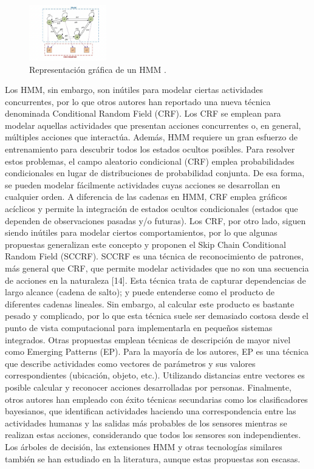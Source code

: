 \documentclass{article}
\begin{document}
\begin{figure}
\centering
\includegraphics[width=0.3\textwidth]{punto2.png}
\caption{\label{fig:frog}Representación gráfica de un HMM .}
\end{figure}

Los HMM, sin embargo, son inútiles para modelar ciertas actividades concurrentes, por lo que otros autores han reportado una nueva técnica denominada Conditional Random Field (CRF). Los CRF se emplean para modelar aquellas actividades que presentan acciones concurrentes o, en general, múltiples acciones que interactúa. Además, HMM requiere un gran esfuerzo de entrenamiento para descubrir todos los estados ocultos posibles. Para resolver estos problemas, el campo aleatorio condicional (CRF) emplea probabilidades condicionales en lugar de distribuciones de probabilidad conjunta. De esa forma, se pueden modelar fácilmente actividades cuyas acciones se desarrollan en cualquier orden. A diferencia de las cadenas en HMM, CRF emplea gráficos acíclicos y permite la integración de estados ocultos condicionales (estados que dependen de observaciones pasadas y/o futuras).
Los CRF, por otro lado, siguen siendo inútiles para modelar ciertos comportamientos, por lo que algunas propuestas generalizan este concepto y proponen el Skip Chain Conditional Random Field (SCCRF). SCCRF es una técnica de reconocimiento de patrones, más general que CRF, que permite modelar actividades que no son una secuencia de acciones en la naturaleza [14]. Esta técnica trata de capturar dependencias de largo alcance (cadena de salto); y puede entenderse como el producto de diferentes cadenas lineales. Sin embargo, al calcular este producto
es bastante pesado y complicado, por lo que esta técnica suele ser demasiado costosa desde el punto de vista computacional para implementarla en pequeños sistemas integrados.
Otras propuestas emplean técnicas de descripción de mayor nivel como Emerging Patterns (EP). Para la mayoría de los autores, EP es una técnica que describe actividades como vectores de parámetros y sus valores correspondientes (ubicación, objeto, etc.).  Utilizando distancias entre vectores es posible calcular y reconocer acciones desarrolladas por personas. Finalmente, otros autores han empleado con éxito técnicas secundarias como los clasificadores bayesianos, que identifican actividades haciendo una correspondencia entre las actividades humanas y las salidas más probables de los sensores mientras se realizan estas acciones, considerando que todos los sensores son independientes. Los árboles de decisión, las extensiones HMM y otras tecnologías similares también se han estudiado en la literatura, aunque estas propuestas son escasas.
\end{document}
